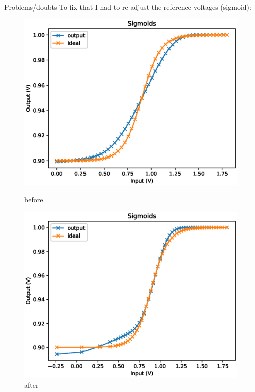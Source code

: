 \documentclass[table]{beamer}
\begin{document}
\begin{frame}{Problems/doubts}
  To fix that I had to re-adjust the reference voltages (sigmoid):
  \begin{figure}[!tbp]
    \centering
    \begin{minipage}[b]{0.4\textwidth}
      \centering
      \includegraphics[width=\textwidth]{activation/sigmoid}
      \caption{before}
    \end{minipage}
    \hspace{20pt}
    \begin{minipage}[b]{0.4\textwidth}
      \centering
      \includegraphics[width=\textwidth]{activation/realSigmoid}
      \caption{after}
    \end{minipage}
  \end{figure}
\end{frame}
\end{document}
